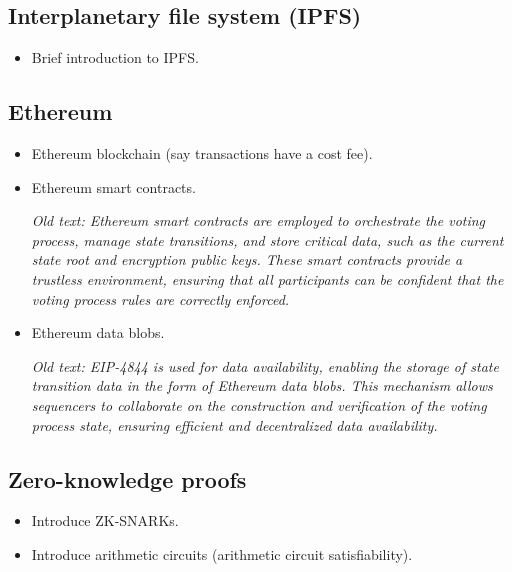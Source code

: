 
\subsection{Interplanetary file system (IPFS)}
\label{sec:background:ipfs}

\begin{itemize}
	\item Brief introduction to IPFS.
\end{itemize}

\subsection{Ethereum}
\label{sec:background:ethereum}

\begin{itemize}
	\item Ethereum blockchain (say transactions have a cost fee).
	\item Ethereum smart contracts.
	
	\textit{Old text: Ethereum smart contracts are employed to orchestrate the voting process, manage state transitions, and store critical data, such as the current state root and encryption public keys. These smart contracts provide a trustless environment, ensuring that all participants can be confident that the voting process rules are correctly enforced.}
	
	\item Ethereum data blobs.
	
	\textit{Old text: EIP-4844 is used for data availability, enabling the storage of state transition data in the form of Ethereum data blobs. This mechanism allows sequencers to collaborate on the construction and verification of the voting process state, ensuring efficient and decentralized data availability.}
	
\end{itemize}

\subsection{Zero-knowledge proofs}
\label{sec:background:zkp}

\begin{itemize}
	\item Introduce ZK-SNARKs.
	\item Introduce arithmetic circuits (arithmetic circuit satisfiability).
\end{itemize}